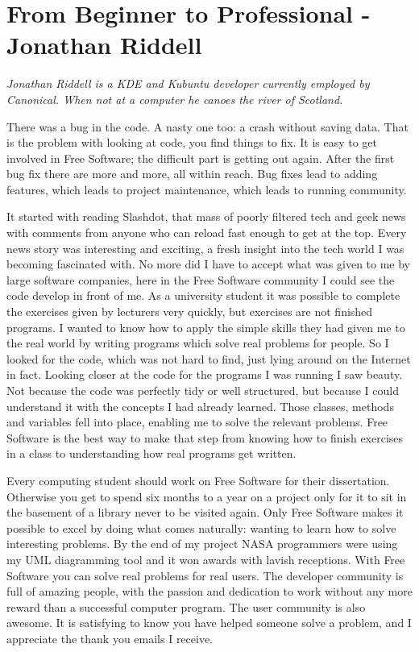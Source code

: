 \chapter{From Beginner to Professional - Jonathan Riddell}

\textit{Jonathan Riddell is a KDE and Kubuntu developer currently employed by
Canonical. When not at a computer he canoes the river of Scotland.}

There was a bug in the code. A nasty one too: a crash without saving data. That
is the problem with looking at code, you find things to fix. It is easy to get
involved in Free Software; the difficult part is getting out again. After the
first bug fix there are more and more, all within reach. Bug fixes lead to
adding features, which leads to project maintenance, which leads to running
community. 

It started with reading Slashdot, that mass of poorly filtered tech and geek
news with comments from anyone who can reload fast enough to get at the top.
Every news story was interesting and exciting, a fresh insight into the tech
world I was becoming fascinated with. No more did I have to accept what was
given to me by large software companies, here in the Free Software community I
could see the code develop in front of me.
As a university student it was possible to complete the exercises given by
lecturers very quickly, but exercises are not finished programs. I wanted to
know how to apply the simple skills they had given me to the real world by
writing programs which solve real problems for people. So I looked for the code,
which was not hard to find, just lying around on the Internet in fact. 
Looking closer at the code for the programs I was running I saw beauty. Not
because the code was perfectly tidy or well structured, but because I could
understand it with the concepts I had already learned. Those classes, methods
and variables fell into place, enabling me to solve the relevant problems. Free
Software is the best way to make that step from knowing how to finish exercises
in a class to understanding how real programs get written.

Every computing student should work on Free Software for their dissertation.
Otherwise you get to spend six months to a year on a project only for it to sit
in the basement of a library never to be visited again. Only Free Software makes
it possible to excel by doing what comes naturally: wanting to learn how to
solve interesting problems. By the end of my project NASA programmers were using
my UML diagramming tool and it won awards with lavish receptions. With Free
Software you can solve real problems for real users.
The developer community is full of amazing people, with the passion and
dedication to work without any more reward than a successful computer program.
The user community is also awesome. It is satisfying to know you have helped
someone solve a problem, and I appreciate the thank you emails I receive.

